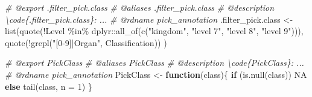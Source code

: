\documentclass[
]{article}
\newenvironment{Shaded}{\begin{snugshade}}{\end{snugshade}}
\newcommand{\AttributeTok}[1]{\textcolor[rgb]{0.77,0.63,0.00}{#1}}
\newcommand{\CommentTok}[1]{\textcolor[rgb]{0.56,0.35,0.01}{\textit{#1}}}
\newcommand{\ConstantTok}[1]{\textcolor[rgb]{0.00,0.00,0.00}{#1}}
\newcommand{\ControlFlowTok}[1]{\textcolor[rgb]{0.13,0.29,0.53}{\textbf{#1}}}
\newcommand{\DecValTok}[1]{\textcolor[rgb]{0.00,0.00,0.81}{#1}}
\newcommand{\FunctionTok}[1]{\textcolor[rgb]{0.00,0.00,0.00}{#1}}
\newcommand{\NormalTok}[1]{#1}
\newcommand{\OtherTok}[1]{\textcolor[rgb]{0.56,0.35,0.01}{#1}}
\newcommand{\SpecialCharTok}[1]{\textcolor[rgb]{0.00,0.00,0.00}{#1}}
\newcommand{\StringTok}[1]{\textcolor[rgb]{0.31,0.60,0.02}{#1}}
\begin{document}
\begin{Shaded}
\begin{Highlighting}[]
\CommentTok{\#\textquotesingle{} @export .filter\_pick.class}
\CommentTok{\#\textquotesingle{} @aliases .filter\_pick.class}
\CommentTok{\#\textquotesingle{} @description \textbackslash{}code\{.filter\_pick.class\}: ...}
\CommentTok{\#\textquotesingle{} @rdname pick\_annotation}
\NormalTok{.filter\_pick.class }\OtherTok{\textless{}{-}} 
  \FunctionTok{list}\NormalTok{(}\FunctionTok{quote}\NormalTok{(}\SpecialCharTok{!}\NormalTok{Level }\SpecialCharTok{\%in\%}\NormalTok{ dplyr}\SpecialCharTok{::}\FunctionTok{all\_of}\NormalTok{(}\FunctionTok{c}\NormalTok{(}\StringTok{"kingdom"}\NormalTok{, }\StringTok{"level 7"}\NormalTok{, }\StringTok{"level 8"}\NormalTok{, }\StringTok{"level 9"}\NormalTok{))),}
    \FunctionTok{quote}\NormalTok{(}\SpecialCharTok{!}\FunctionTok{grepl}\NormalTok{(}\StringTok{"[0{-}9]|Organ"}\NormalTok{, Classification))}
\NormalTok{  )}

\CommentTok{\#\textquotesingle{} @export PickClass}
\CommentTok{\#\textquotesingle{} @aliases PickClass}
\CommentTok{\#\textquotesingle{} @description \textbackslash{}code\{PickClass\}: ...}
\CommentTok{\#\textquotesingle{} @rdname pick\_annotation}
\NormalTok{PickClass }\OtherTok{\textless{}{-}} 
  \ControlFlowTok{function}\NormalTok{(class)\{}
    \ControlFlowTok{if}\NormalTok{ (}\FunctionTok{is.null}\NormalTok{(class)) }\ConstantTok{NA}
    \ControlFlowTok{else} \FunctionTok{tail}\NormalTok{(class, }\AttributeTok{n =} \DecValTok{1}\NormalTok{)}
\NormalTok{  \}}


\end{Highlighting}
\end{Shaded}
\end{document}
